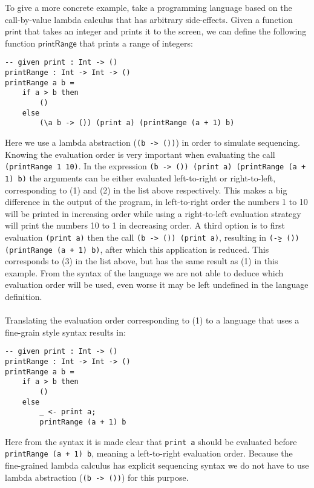 {To give a more concrete example, take a programming language based on the call-by-value lambda calculus that has arbitrary side-effects. Given a function $\mathsf{print}$ that takes an integer and prints it to the screen, we can define the following function $\mathsf{printRange}$ that prints a range of integers:
\begin{verbatim}
-- given print : Int -> ()
printRange : Int -> Int -> ()
printRange a b =
	if a > b then
		()
	else
		(\a b -> ()) (print a) (printRange (a + 1) b)
\end{verbatim}
Here we use a lambda abstraction (\texttt{(\a b -> ())}) in order to simulate sequencing.
Knowing the evaluation order is very important when evaluating the call \texttt{(printRange 1 10)}.
In the expression \texttt{(\a b -> ()) (print a) (printRange (a + 1) b)} the arguments can be either evaluated left-to-right or right-to-left, corresponding to (1) and (2) in the list above respectively.
This makes a big difference in the output of the program, in left-to-right order the numbers 1 to 10 will be printed in increasing order while using a right-to-left evaluation strategy will print the numbers 10 to 1 in decreasing order.
A third option is to first evaluation \texttt{(print a)} then the call \texttt{(\a b -> ()) (print a)}, resulting in \texttt{(\b -> ()) (printRange (a + 1) b)}, after which this application is reduced. This corresponds to (3) in the list above, but has the same result as (1) in this example.
From the syntax of the language we are not able to deduce which evaluation order will be used, even worse it may be left undefined in the language definition.
\\\\
Translating the evaluation order corresponding to (1) to a language that uses a fine-grain style syntax results in:
\begin{verbatim}
-- given print : Int -> ()
printRange : Int -> Int -> ()
printRange a b =
	if a > b then
		()
	else
		_ <- print a;
		printRange (a + 1) b
\end{verbatim}
Here from the syntax it is made clear that \texttt{print a} should be evaluated before \texttt{printRange (a + 1) b}, meaning a left-to-right evaluation order. Because the fine-grained lambda calculus has explicit sequencing syntax we do not have to use lambda abstraction (\texttt{(\a b -> ())}) for this purpose.
\\\\
}
